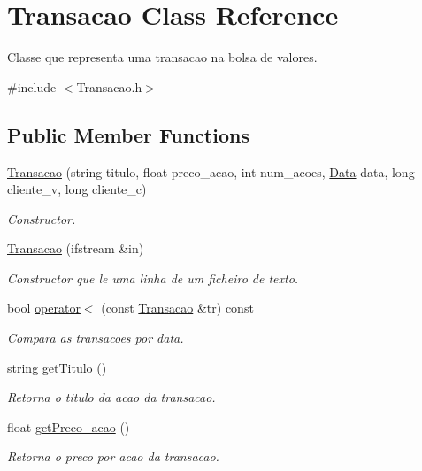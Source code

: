 \hypertarget{class_transacao}{}\section{Transacao Class Reference}
\label{class_transacao}


Classe que representa uma transacao na bolsa de valores.  




{\ttfamily \#include $<$Transacao.\+h$>$}

\subsection*{Public Member Functions}
\begin{DoxyCompactItemize}
\item 
\hyperlink{class_transacao_a85413a667a5e4e7632c7926900d3d517}{Transacao} (string titulo, float preco\+\_\+acao, int num\+\_\+acoes, \hyperlink{class_data}{Data} data, long cliente\+\_\+v, long cliente\+\_\+c)
\begin{DoxyCompactList}\small\item\em Constructor. \end{DoxyCompactList}\item 
\hyperlink{class_transacao_adad7dd2c36a20c16e0ac40e3a5822650}{Transacao} (ifstream \&in)
\begin{DoxyCompactList}\small\item\em Constructor que le uma linha de um ficheiro de texto. \end{DoxyCompactList}\item 
bool \hyperlink{class_transacao_a99deb0eadbb36741646610299c2fecad}{operator$<$} (const \hyperlink{class_transacao}{Transacao} \&tr) const
\begin{DoxyCompactList}\small\item\em Compara as transacoes por data. \end{DoxyCompactList}\item 
string \hyperlink{class_transacao_af48d21e7643548e9b8ff9ee9d1cd39c8}{get\+Titulo} ()
\begin{DoxyCompactList}\small\item\em Retorna o titulo da acao da transacao. \end{DoxyCompactList}\item 
float \hyperlink{class_transacao_a04806fca6de35ac9f57044c2bd2c39b3}{get\+Preco\+\_\+acao} ()
\begin{DoxyCompactList}\small\item\em Retorna o preco por acao da transacao. \end{DoxyCompactList}\item 

\end{DoxyCompactItemize}
